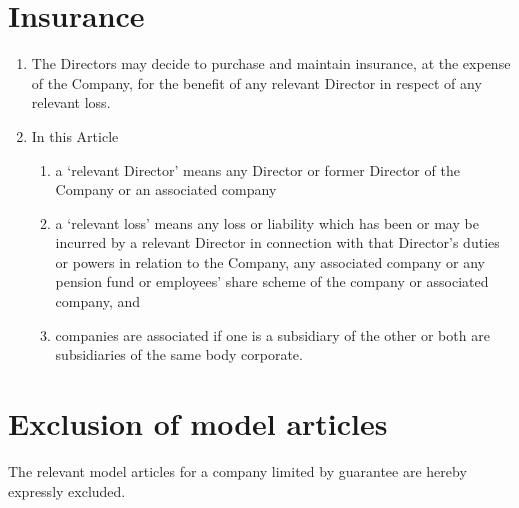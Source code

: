 \documentclass[a4paper,12pt]{article}
\renewcommand{\labelenumii}{(\alph{enumii})}
\begin{document}
\section{Insurance}

\begin{enumerate}
  \item The Directors may decide to purchase and maintain insurance, at the expense of the Company, for the benefit of any relevant Director in respect of any relevant loss.
  \item In this Article
  \begin{enumerate}
    \renewcommand{\labelenumii}{(\alph{enumii})}
    \item a `relevant Director' means any Director or former Director of the Company or an associated company
    \item a `relevant loss' means any loss or liability which has been or may be incurred by a relevant Director in connection with that Director’s duties or powers in relation to the Company, any associated company or any pension fund or employees’ share scheme of the company or associated company, and
    \item companies are associated if one is a subsidiary of the other or both are subsidiaries of the same body corporate.
  \end{enumerate}
\end{enumerate}

\section{Exclusion of model articles}

The relevant model articles for a company limited by guarantee are hereby expressly excluded.
\end{document}
